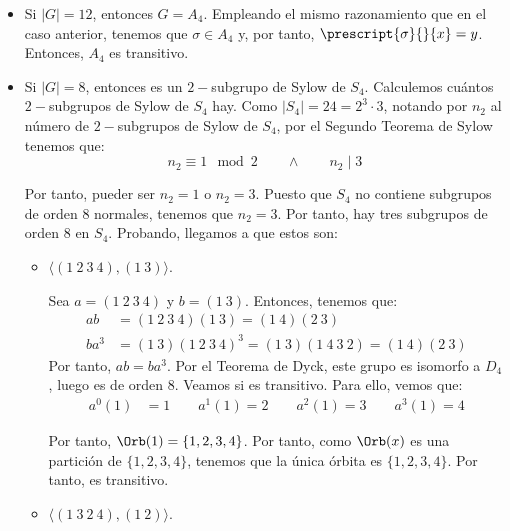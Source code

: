 \begin{ejercicio}
\begin{enumerate}
\begin{itemize}
            \item Si $|G|=12$, entonces $G=A_4$. Empleando el mismo razonamiento que en el caso anterior, tenemos que $\sigma\in A_4$ y, por tanto, $\prescript{\sigma}{}{x} = y$. Entonces, $A_4$ es transitivo.
            
            \item Si $|G|=8$, entonces es un $2-$subgrupo de Sylow de $S_4$. Calculemos cuántos $2-$subgrupos de Sylow de $S_4$ hay. Como $|S_4|=24=2^3\cdot 3$, notando por $n_2$ al número de $2-$subgrupos de Sylow de $S_4$, por el Segundo Teorema de Sylow tenemos que:
            \begin{equation*}
                n_2 \equiv 1 \mod 2 \qquad\land \qquad n_2 \mid 3
            \end{equation*}

            Por tanto, pueder ser $n_2=1$ o $n_2=3$. Puesto que $S_4$ no contiene subgrupos de orden $8$ normales, tenemos que $n_2=3$. Por tanto, hay tres subgrupos de orden $8$ en $S_4$. Probando, llegamos a que estos son:
            \begin{itemize}
                \item $\langle (1\ 2\ 3\ 4), (1\ 3)\rangle$.
                
                Sea $a=(1\ 2\ 3\ 4)$ y $b=(1\ 3)$. Entonces, tenemos que:
                \begin{align*}
                    ab &= (1\ 2\ 3\ 4)(1\ 3) = (1\ 4)(2\ 3)\\
                    ba^3 &= (1\ 3)(1\ 2\ 3\ 4)^3
                    = (1\ 3)(1\ 4\ 3\ 2) = (1\ 4)(2\ 3)
                \end{align*}
                Por tanto, $ab=ba^3$. Por el Teorema de Dyck, este grupo es isomorfo a $D_4$, luego es de orden $8$. Veamos si es transitivo. Para ello, vemos que:
                \begin{align*}
                    a^0(1) &= 1 \qquad
                    a^1(1) = 2 \qquad
                    a^2(1) = 3 \qquad
                    a^3(1) = 4
                \end{align*}

                Por tanto, $\Orb(1)=\{1, 2, 3, 4\}$. Por tanto, como $\Orb(x)$ es una partición de $\{1, 2, 3, 4\}$, tenemos que la única órbita es $\{1, 2, 3, 4\}$. Por tanto, es transitivo.

                \item $\langle (1\ 3\ 2\ 4), (1\ 2)\rangle$.
                

\end{itemize}
\end{itemize}
\end{enumerate}
\end{ejercicio}
